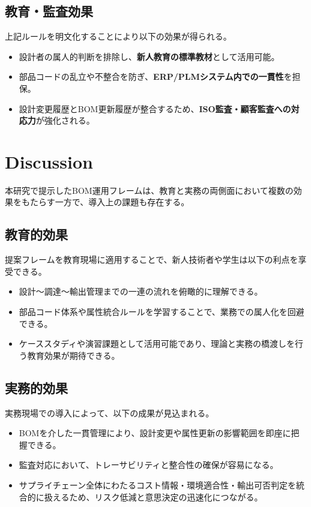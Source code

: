 \documentclass[10pt,conference]{IEEEtran}
\begin{document}
\subsection{教育・監査効果}
上記ルールを明文化することにより以下の効果が得られる。
\begin{itemize}
  \item 設計者の属人的判断を排除し、\textbf{新人教育の標準教材}として活用可能。
  \item 部品コードの乱立や不整合を防ぎ、\textbf{ERP/PLMシステム内での一貫性}を担保。
  \item 設計変更履歴とBOM更新履歴が整合するため、\textbf{ISO監査・顧客監査への対応力}が強化される。
\end{itemize}

\section{Discussion}
本研究で提示したBOM運用フレームは、教育と実務の両側面において複数の効果をもたらす一方で、導入上の課題も存在する。

\subsection{教育的効果}
提案フレームを教育現場に適用することで、新人技術者や学生は以下の利点を享受できる。
\begin{itemize}
  \item 設計～調達～輸出管理までの一連の流れを俯瞰的に理解できる。
  \item 部品コード体系や属性統合ルールを学習することで、業務での属人化を回避できる。
  \item ケーススタディや演習課題として活用可能であり、理論と実務の橋渡しを行う教育効果が期待できる。
\end{itemize}

\subsection{実務的効果}
実務現場での導入によって、以下の成果が見込まれる。
\begin{itemize}
  \item BOMを介した一貫管理により、設計変更や属性更新の影響範囲を即座に把握できる。
  \item 監査対応において、トレーサビリティと整合性の確保が容易になる。
  \item サプライチェーン全体にわたるコスト情報・環境適合性・輸出可否判定を統合的に扱えるため、リスク低減と意思決定の迅速化につながる。
\end{itemize}
\end{document}
